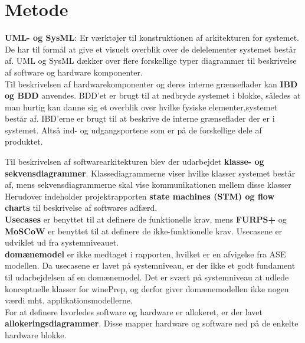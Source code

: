 \section{Metode}

\textbf{UML- og SysML}: Er værktøjer til konstruktionen af arkitekturen for systemet. De har til formål at give et visuelt overblik over de delelementer 
systemet består af. UML og SysML dækker over flere forskellige typer diagrammer til beskrivelse af software og hardware komponenter. \\ 

Til beskrivelsen af hardwarekomponenter og deres interne grænseflader kan \textbf {IBD og BDD} anvendes. BDD’et er brugt til at nedbryde systemet i blokke, 
således at man hurtig kan danne sig et overblik over hvilke fysiske elementer,systemet består af. IBD’erne er brugt til at beskrive de interne grænseflader der 
er i systemet. Altså ind- og udgangsportene som er på de forskellige dele af produktet.

Til beskrivelsen af softwarearkitekturen blev der udarbejdet \textbf{klasse- og sekvensdiagrammer}. Klassediagrammerne viser hvilke klasser systemet 
består af, mens sekvensdiagrammerne skal vise kommunikationen mellem disse klasser \\

Herudover indeholder projektrapporten \textbf{state machines (STM) og flow charts} til beskrivelse af softwares adfærd.\\

\textbf{Usecases}  er benyttet til at definere de funktionelle krav, mens \textbf{FURPS+} og \textbf{MoSCoW} er benyttet til at definere de 
ikke-funktionelle krav. Usecasene er udviklet ud fra systemniveauet.\\

\textbf{domænemodel} er ikke medtaget i rapporten, hvilket er en afvigelse fra ASE modellen. Da usecasene er lavet på systemniveau, er der ikke et godt 
fundament til udarbejdelsen af en domænemodel. Det er svært på systemniveau at udlede konceptuelle klasser for winePrep, og derfor giver domænemodellen ikke 
nogen værdi mht. applikationsmodellerne.\\
 
For at definere hvorledes software og hardware er allokeret, er der lavet \textbf{allokeringsdiagrammer}. Disse mapper hardware og software ned på de enkelte
hardware blokke.\\
